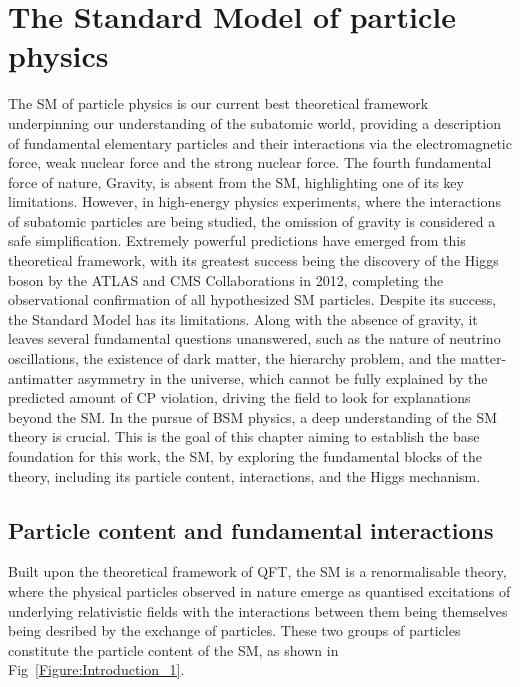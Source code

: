 \chapter{The Standard Model of particle physics}

The \ac{SM} of particle physics is our current best theoretical framework underpinning our understanding of the subatomic world, providing a description of fundamental elementary particles and their interactions via the electromagnetic force, weak nuclear force and the strong nuclear force. The fourth fundamental force of nature, Gravity, is absent from the SM, highlighting one of its key limitations. However, in high-energy physics experiments, where the interactions of subatomic particles are being studied, the omission of gravity is considered a safe simplification. Extremely powerful predictions have emerged from this theoretical framework, with its greatest success being the discovery of the Higgs boson by the ATLAS and CMS Collaborations in 2012, completing the observational confirmation of all hypothesized SM particles. Despite its success, the Standard Model has its limitations. Along with the absence of gravity, it leaves several fundamental questions unanswered, such as the nature of neutrino oscillations, the existence of dark matter, the hierarchy problem, and the matter-antimatter asymmetry in the universe, which cannot be fully explained by the predicted amount of CP violation, driving the field to look for explanations beyond the SM. In the pursue of \ac{BSM} physics, a deep understanding of the SM theory is crucial. This is the goal of this chapter aiming to establish the base foundation for this work, the SM, by exploring the fundamental blocks of the theory, including its particle content, interactions, and the Higgs mechanism.

\section{Particle content and fundamental interactions}

Built upon the theoretical framework of \ac{QFT}, the SM is a renormalisable theory, where the physical particles observed in nature emerge as quantised excitations of underlying relativistic fields with the interactions between them being themselves being desribed by the exchange of particles. These two groups of particles constitute the particle content of the SM, as shown in Fig~\ref{Figure:Introduction_1}.

